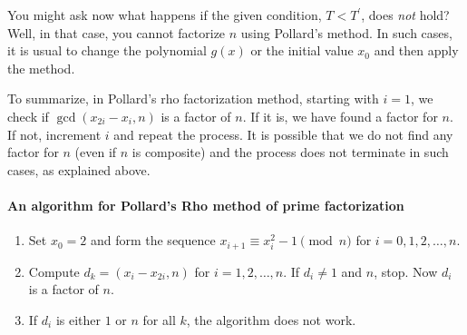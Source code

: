 You might ask now what happens if the given condition, $T<T^{\prime}$, does \textit{not} hold? Well, in that case, you cannot factorize $n$ using Pollard's method. In such cases, it is usual to change the polynomial $g(x)$ or the initial value $x_0$ and then apply the method.


To summarize, in Pollard's rho factorization method, starting with $i=1$, we check if $\gcd(x_{2i} - x_{i}, n)$ is a factor of $n$. If it is, we have found a factor for $n$. If not, increment $i$ and repeat the process. It is possible that we do not find any factor for $n$ (even if $n$ is composite) and the process does not terminate in such cases, as explained above.
\paragraph{An algorithm for Pollard's Rho method of prime factorization}
\begin{enumerate}[1.]
	\item Set $x_0=2$ and form the sequence $x_{i+1} \equiv x_i^2 -1 \pmod n$ for $i=0,1,2,\ldots, n$.
	\item Compute $d_k=(x_i-x_{2i}, n)$ for $i=1,2,\ldots, n$. If $d_i \neq 1$ and $n$, stop. Now $d_i$ is a factor of $n$.
	\item If $d_i$ is either $1$ or $n$ for all $k$, the algorithm does not work.
\end{enumerate}

